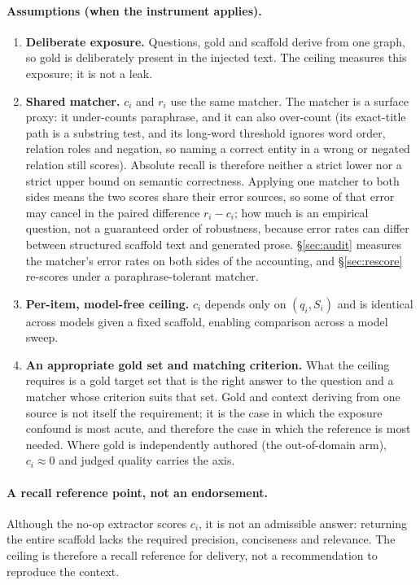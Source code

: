 \documentclass[10pt,twocolumn]{article}
\begin{document}
\paragraph{Assumptions (when the instrument applies).}
\begin{enumerate}[label=(A\arabic*),topsep=2pt,itemsep=1pt,leftmargin=2.4em]
\item \textbf{Deliberate exposure.} Questions, gold and scaffold derive from one graph, so gold is deliberately present in the injected text. The ceiling measures this exposure; it is not a leak.
\item \textbf{Shared matcher.} $c_i$ and $r_i$ use the same matcher. The matcher is a surface proxy: it under-counts paraphrase, and it can also over-count (its exact-title path is a substring test, and its long-word threshold ignores word order, relation roles and negation, so naming a correct entity in a wrong or negated relation still scores). Absolute recall is therefore neither a strict lower nor a strict upper bound on semantic correctness. Applying one matcher to both sides means the two scores share their error sources, so some of that error may cancel in the paired difference $r_i-c_i$; how much is an empirical question, not a guaranteed order of robustness, because error rates can differ between structured scaffold text and generated prose. \S\ref{sec:audit} measures the matcher's error rates on both sides of the accounting, and \S\ref{sec:rescore} re-scores under a paraphrase-tolerant matcher.
\item \textbf{Per-item, model-free ceiling.} $c_i$ depends only on $(q_i,S_i)$ and is identical across models given a fixed scaffold, enabling comparison across a model sweep.
\item \textbf{An appropriate gold set and matching criterion.} What the ceiling requires is a gold target set that is the right answer to the question and a matcher whose criterion suits that set. Gold and context deriving from one source is not itself the requirement; it is the case in which the exposure confound is most acute, and therefore the case in which the reference is most needed. Where gold is independently authored (the out-of-domain arm), $c_i\approx0$ and judged quality carries the axis.
\end{enumerate}

\paragraph{A recall reference point, not an endorsement.} Although the no-op extractor scores $c_i$, it is not an admissible answer: returning the entire scaffold lacks the required precision, conciseness and relevance. The ceiling is therefore a recall reference for delivery, not a recommendation to reproduce the context.
\end{document}
